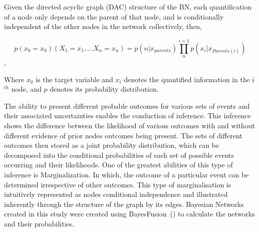 \documentclass[fleqn,10pt]{wlscirep}
\begin{document}


Given the directed acyclic graph (DAC) structure of the BN, each quantification of a node only depends on the parent of that node, and is conditionally independent of the other nodes in the network collectively, then,

\begin{equation}
        p(x_{0}=x_{0}) (X_{1}=x_{1},\ldots X_{n}=x_{n})=p(n|x_{parents})\prod_{n}^{i=1}p(x_{i}|x_{Parents(i)})
\end{equation},

Where $x_0$ is the target variable and $x_i$ denotes the quantified information in the i$^{th}$ node, and $p$ denotes its probability distribution.

The ability to present different probable outcomes for various sets of events and their associated uncertainties enables the conduction of inference. This inference shows the difference between the likelihood of various outcomes with and without different evidence of prior nodes outcomes being present. The sets of different outcomes then stored as a joint probability distribution, which can be decomposed into the conditional probabilities of each set of possible events occurring and their likelihoods. One of the greatest abilities of this type of inference is Marginalization. In which, the outcome of a particular event can be determined irrespective of other outcomes. This type of marginalisation is intuitively represented as nodes conditional independence and illustrated inherently through the structure of the graph by its edges. Bayesian Networks created in this study were created using BayesFusion~(\cite{bayesfusionGeNIeModelerUSER2022}) to calculate the networks and their probabilities. 
\end{document}
